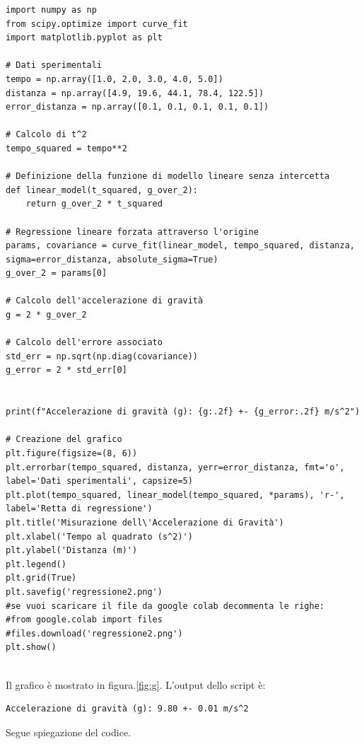 \documentclass[12pt,a4paper,oneside]{book}
\theoremstyle{esercizio}
\begin{document}
\begin{lstlisting}[caption={Calcolo della Regressione Lineare e Accelerazione di Gravità}]
import numpy as np
from scipy.optimize import curve_fit
import matplotlib.pyplot as plt

# Dati sperimentali
tempo = np.array([1.0, 2.0, 3.0, 4.0, 5.0])
distanza = np.array([4.9, 19.6, 44.1, 78.4, 122.5])
error_distanza = np.array([0.1, 0.1, 0.1, 0.1, 0.1])

# Calcolo di t^2
tempo_squared = tempo**2

# Definizione della funzione di modello lineare senza intercetta
def linear_model(t_squared, g_over_2):
    return g_over_2 * t_squared

# Regressione lineare forzata attraverso l'origine
params, covariance = curve_fit(linear_model, tempo_squared, distanza, sigma=error_distanza, absolute_sigma=True)
g_over_2 = params[0]

# Calcolo dell'accelerazione di gravità
g = 2 * g_over_2

# Calcolo dell'errore associato
std_err = np.sqrt(np.diag(covariance))
g_error = 2 * std_err[0]


print(f"Accelerazione di gravità (g): {g:.2f} +- {g_error:.2f} m/s^2")

# Creazione del grafico
plt.figure(figsize=(8, 6))
plt.errorbar(tempo_squared, distanza, yerr=error_distanza, fmt='o', label='Dati sperimentali', capsize=5)
plt.plot(tempo_squared, linear_model(tempo_squared, *params), 'r-', label='Retta di regressione')
plt.title('Misurazione dell\'Accelerazione di Gravità')
plt.xlabel('Tempo al quadrato (s^2)')
plt.ylabel('Distanza (m)')
plt.legend()
plt.grid(True)
plt.savefig('regressione2.png')
#se vuoi scaricare il file da google colab decommenta le righe:
#from google.colab import files
#files.download('regressione2.png')
plt.show()


\end{lstlisting}


Il grafico è mostrato in figura.\ref{fig:g}. L'output dello script è:
\begin{verbatim}
Accelerazione di gravità (g): 9.80 +- 0.01 m/s^2
\end{verbatim}

Segue spiegazione del codice.
\end{document}
